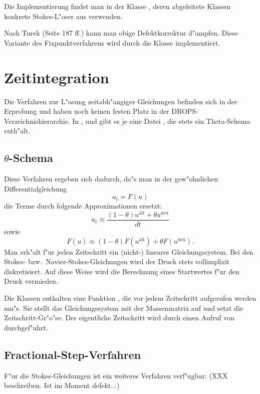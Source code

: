\documentclass[11pt,a4paper]{article}
\begin{document}
Die Implementierung findet man in der Klasse ,
deren abgeleitete Klassen konkrete Stokes-L"oser aus
 verwenden.

Nach Turek (Seite 187 ff.) kann man obige Defektkorrektur
d"ampfen. Diese Variante des Fixpunktverfahrens wird durch die Klasse
 implementiert.

\section{Zeitintegration}
Die Verfahren zur L"osung zeitabh"angiger Gleichungen befinden
sich in der Erprobung und haben noch keinen festen Platz in der
DROPS-Verzeichnishierarchie.  In ,  und
 gibt es je eine Datei , die stets ein
Theta-Schema enth"alt.

\subsection{$\theta$-Schema}
Diese Verfahren ergeben sich dadurch, da"s man in der gew"ohnlichen Differentialgleichung
\[
  u_t = F(u)
\]
die Terme durch folgende Approximationen ersetzt:
$$
  u_t \approx \frac{(1-\theta) u^\text{alt} + \theta u^\text{neu}}{dt}
$$
sowie
\[
  F(u) \approx (1-\theta) F(u^\text{alt}) + \theta F(u^\text{neu}).
\]
Man erh"alt f"ur
jeden Zeitschritt ein (nicht-) lineares Gleichungssystem. Bei den Stokes-
bzw.\ Navier-Stokes-Gleichungen wird der Druck stets vollimplizit
diskretisiert.  Auf diese Weise wird die Berechnung eines Startwertes
f"ur den Druck vermieden.

Die Klassen  enthalten eine Funktion
, die vor jedem Zeitschritt aufgerufen werden mu"s. Sie
stellt das Gleichungssystem mit der Massenmatrix auf und setzt die
Zeitschritt-Gr"o"se.  Der eigentliche Zeitschritt wird durch einen Aufruf
von  durchgef"uhrt.

\subsection{Fractional-Step-Verfahren}
F"ur die Stokes-Gleichungen ist ein weiteres Verfahren verf"ugbar:
(XXX beschreiben. Ist im Moment defekt...)

\end{document}
